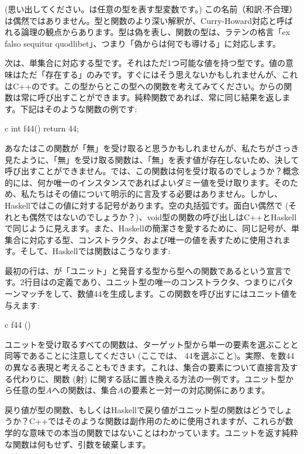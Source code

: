  (思い出してください。は任意の型を表す型変数です。) この名前（和訳:不合理）は偶然ではありません。型と関数のより深い解釈が、Curry-Howard対応と呼ばれる論理の観点からあります。型は偽を表し、関数の型は、ラテンの格言「ex falso sequitur quodlibet」、つまり「偽からは何でも導ける」に対応します。

次は、単集合に対応する型です。それはただ1つ可能な値を持つ型です。値の意味はただ「存在する」のみです。すぐにはそう思えないかもしれませんが、これはC++のです。この型からとこの型への関数を考えてみてください。からの関数は常に呼び出すことができます。純粋関数であれば、常に同じ結果を返します。下記はそのような関数の例です: 

\begin{snip}{c}
int f44() { return 44; }
\end{snip}
あなたはこの関数が「無」を受け取ると思うかもしれませんが、私たちがさっき見たように、「無」を受け取る関数は、「無」を表す値が存在しないため、決して呼び出すことができません。では、この関数は何を受け取るのでしょうか？概念的には、何か唯一のインスタンスであればよいダミー値を受け取ります。そのため、私たちはその値について明示的に言及する必要はありません。しかし、Haskellではこの値に対する記号があります。空の丸括弧\code{()}です。面白い偶然で (それとも偶然ではないのでしょうか？)、void型の関数の呼び出しはC++とHaskellで同じように見えます。また、Haskellの簡潔さを愛するために、同じ記号\code{()}が、単集合に対応する型、コンストラクタ、および唯一の値を表すために使用されます。そして、Haskellでは関数はこうなります: 

最初の行は、が「ユニット」と発音する型\code{()}から型への関数であるという宣言です。2行目はの定義であり、ユニット型の唯一のコンストラクタ、つまり\code{()}にパターンマッチをして、数値44を生成します。この関数を呼び出すにはユニット値\code{()}を与えます: 

\begin{snip}{c}
f44 ()
\end{snip}
ユニットを受け取るすべての関数は、ターゲット型から単一の要素を選ぶことと同等であることに注意してください (ここでは、 44を選ぶこと)。実際、を数44の異なる表現と考えることもできます。これは、集合の要素について直接言及する代わりに、関数 (射) に関する話に置き換える方法の一例です。ユニット型から任意の型$A$への関数は、集合$A$の要素と一対一の対応関係にあります。

戻り値が型の関数、もしくはHaskellで戻り値がユニット型の関数はどうでしょうか？C++ではそのような関数は副作用のために使用されますが、これらが数学的な意味での本当の関数ではないことはわかっています。ユニットを返す純粋な関数は何もせず、引数を破棄します。

